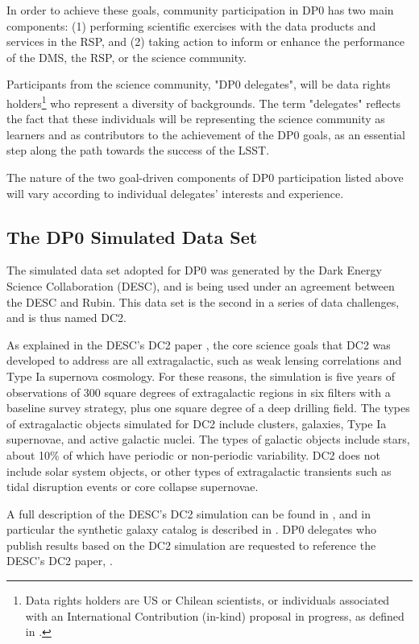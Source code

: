 \documentclass[DM,lsstdraft,authoryear,toc]{lsstdoc}
\begin{document}
In order to achieve these goals, community participation in DP0 has two main components:
(1) performing scientific exercises with the data products and services in the RSP, and
(2) taking action to inform or enhance the performance of the DMS, the RSP, or the science community.

Participants from the science community, "DP0 delegates", will be data rights holders\footnote{Data rights holders are US or Chilean scientists, or individuals associated with an International Contribution (in-kind) proposal in progress, as defined in .} who represent a diversity of backgrounds.
The term "delegates" reflects the fact that these individuals will be representing the science community as learners and as contributors to the achievement of the DP0 goals, as an essential step along the path towards the success of the LSST. 

The nature of the two goal-driven components of DP0 participation listed above will vary according to individual delegates' interests and experience.

\subsection{The DP0 Simulated Data Set}\label{ssec:intro_dc2}

The simulated data set adopted for DP0 was generated by the Dark Energy Science Collaboration (DESC), and is being used under an agreement between the DESC and Rubin.
This data set is the second in a series of data challenges, and is thus named DC2.

As explained in the DESC's DC2 paper \citep{2020arXiv201005926L}, the core science goals that DC2 was developed to address are all extragalactic, such as weak lensing correlations and Type Ia supernova cosmology.
For these reasons, the simulation is five years of observations of 300 square degrees of extragalactic regions in six filters with a baseline survey strategy, plus one square degree of a deep drilling field.
The types of extragalactic objects simulated for DC2 include clusters, galaxies, Type Ia supernovae, and active galactic nuclei.
The types of galactic objects include stars, about 10\% of which have periodic or non-periodic variability.
DC2 does not include solar system objects, or other types of extragalactic transients such as tidal disruption events or core collapse supernovae.

A full description of the DESC's DC2 simulation can be found in \citep{2020arXiv201005926L}, and in particular the synthetic galaxy catalog is described in \citet{2019ApJS..245...26K}.
DP0 delegates who publish results based on the DC2 simulation are requested to reference the DESC's DC2 paper, \citet{2020arXiv201005926L}.
\end{document}
